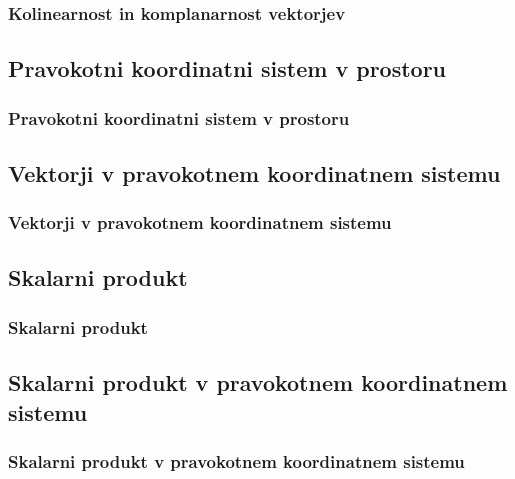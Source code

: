         \begin{frame}
            \frametitle{Kolinearnost in komplanarnost vektorjev}
        \end{frame}

    \subsection{Pravokotni koordinatni sistem v prostoru}

        \begin{frame}
            \frametitle{Pravokotni koordinatni sistem v prostoru}
        \end{frame}

    \subsection{Vektorji v pravokotnem koordinatnem sistemu}

        \begin{frame}
            \frametitle{Vektorji v pravokotnem koordinatnem sistemu}
        \end{frame}

    \subsection{Skalarni produkt}

        \begin{frame}
            \frametitle{Skalarni produkt}
        \end{frame}

    \subsection{Skalarni produkt v pravokotnem koordinatnem sistemu}

        \begin{frame}
            \frametitle{Skalarni produkt v pravokotnem koordinatnem sistemu}
        \end{frame}
